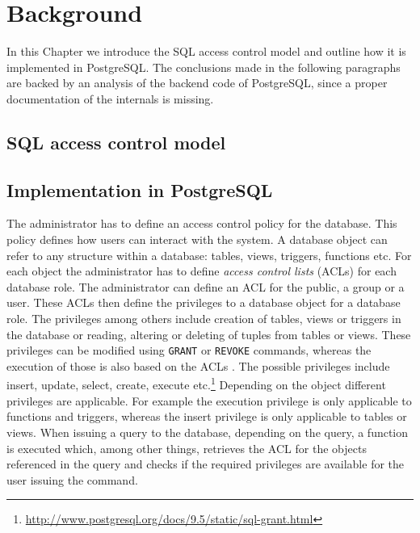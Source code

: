 \section{Background}

In this Chapter we introduce the SQL access control model and outline how it is implemented in PostgreSQL.
%
The conclusions made in the following paragraphs are backed by an analysis of the backend code of PostgreSQL, since a proper documentation of the internals is missing.

\subsection{SQL access control model}


\subsection{Implementation in PostgreSQL}
The administrator has to define an access control policy for the database. 
%
This policy defines how users can interact with the system.
%
A database object  can refer to any structure within a database: tables, views, triggers, functions etc.
%
For each object the administrator has to define \emph{access control lists} (ACLs) for each database role.
%
The administrator can define an ACL for the public, a group\remark{,} or a user. 
%
These ACLs then define the privileges to a database object for a database role.
%
The privileges among others include creation of tables, views or triggers in the database or reading, altering or deleting of tuples from tables or views.
%
These privileges can be modified using \texttt{GRANT} or \texttt{REVOKE} commands, whereas the execution of those is also based on the ACLs .
%
The possible privileges include insert, update, select, create, execute etc.\footnote{\url{http://www.postgresql.org/docs/9.5/static/sql-grant.html}}
%
Depending on the object different privileges are applicable. 
%
For example the execution privilege is only applicable to functions and triggers, whereas the insert privilege is only applicable to tables or views.
%
When issuing a query to the database, depending on the query, a function is executed which, among other things, retrieves the ACL for the objects referenced in the query and checks if the required privileges are available for the user issuing the command.